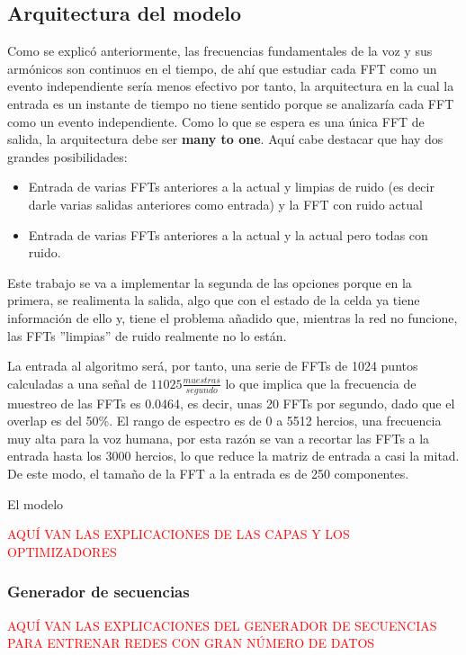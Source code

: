 \subsection{Arquitectura del modelo}
Como se explicó anteriormente, las frecuencias fundamentales de la voz y sus armónicos son continuos en el tiempo, de ahí que estudiar cada \gls{FFT} como un evento independiente sería menos efectivo por tanto, la arquitectura en la cual la entrada es un instante de tiempo no tiene sentido porque se analizaría cada \gls{FFT} como un evento independiente. Como lo que se espera es una única \gls{FFT} de salida, la arquitectura debe ser \textbf{many to one}. Aquí cabe destacar que hay dos grandes posibilidades:
\begin{itemize}
	\item Entrada de varias \glspl{FFT} anteriores a la actual y limpias de ruido (es decir darle varias salidas anteriores como entrada) y la \gls{FFT} con ruido actual
	\item Entrada de varias \glspl{FFT} anteriores a la actual y la actual pero todas con ruido.
\end{itemize}
Este trabajo se va a implementar la segunda de las opciones porque en la primera, se realimenta la salida, algo que con el estado de la celda ya tiene información de ello y, tiene el problema añadido que, mientras la red no funcione, las \glspl{FFT} ''limpias'' de ruido realmente no lo están.

La entrada al algoritmo será, por tanto, una serie de \glspl{FFT} de 1024 puntos calculadas a una señal de $11025\frac{muestras}{segundo}$ lo que implica que la frecuencia de muestreo de las \glspl{FFT} es 0.0464, es decir, unas 20 \glspl{FFT} por segundo, dado que el overlap es del 50\%. El rango de espectro es de 0 a 5512 hercios, una frecuencia muy alta para la voz humana, por esta razón se van a recortar las \glspl{FFT} a la entrada hasta los 3000 hercios, lo que reduce la matriz de entrada a casi la mitad. De este modo, el tamaño de la \gls{FFT} a la entrada es de 250 componentes.

El modelo 

\textcolor{red}{AQUÍ VAN LAS EXPLICACIONES DE LAS CAPAS Y LOS OPTIMIZADORES}
\subsubsection{Generador de secuencias}
\textcolor{red}{AQUÍ VAN LAS EXPLICACIONES DEL GENERADOR DE SECUENCIAS PARA ENTRENAR REDES CON GRAN NÚMERO DE DATOS}